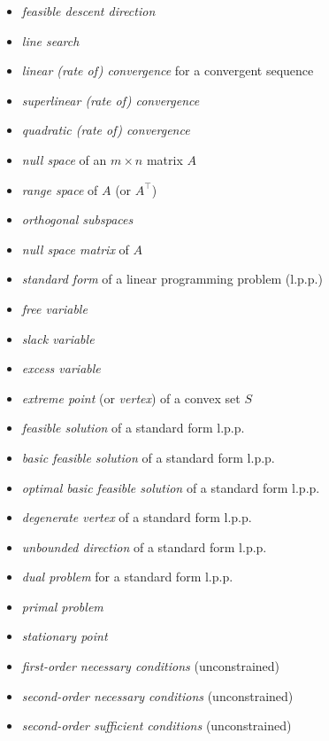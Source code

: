 \documentclass[12pt]{amsart}
\begin{document}
\begin{itemize}
\item \emph{feasible descent direction} \pb
\item \emph{line search} \pb
\item \emph{linear (rate of) convergence} for a convergent sequence \pb
\item \emph{superlinear (rate of) convergence} \pb
\item \emph{quadratic (rate of) convergence} \pb
\item \emph{null space} of an $m\times n$ matrix $A$ \pb
\item \emph{range space} of $A$ (or $A^\top$) \pb
\item \emph{orthogonal subspaces} \pb
\item \emph{null space matrix} of $A$ \pb
\item \emph{standard form} of a linear programming problem (l.p.p.) \pb
\item \emph{free variable} \pb
\item \emph{slack variable} \pb
\item \emph{excess variable} \pb
\item \emph{extreme point} (or \emph{vertex}) of a convex set $S$ \pb
\item \emph{feasible solution} of a standard form l.p.p. \pb
\item \emph{basic feasible solution} of a standard form l.p.p. \pb
\item \emph{optimal basic feasible solution} of a standard form l.p.p. \pb
\item \emph{degenerate vertex} of a standard form l.p.p. \pb
\item \emph{unbounded direction} of a standard form l.p.p. \pb
\item \emph{dual problem} for a standard form l.p.p. \pb
\item \emph{primal problem} \pb
\item \emph{stationary point} \pb
\item \emph{first-order necessary conditions} (unconstrained) \pb
\item \emph{second-order necessary conditions} (unconstrained) \pb
\item \emph{second-order sufficient conditions} (unconstrained) \pb
\end{itemize}

\vfill

\newcommand{\pg}[1]{\hfill p.~#1}
\newcommand{\pgs}[1]{\hfill pp.~#1}
\newcommand{\proveit}{\quad\textbf{\emph{be able to prove}}}
\end{document}
